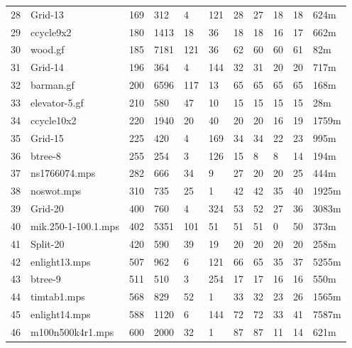 \documentclass{article}
\begin{document}
\begin{longtable}{|l |l |l |l |l |l |l |l |l |l |l |}
28&Grid-13&169&312&4&121&28&27&18&18&624m\\
29&ccycle9x2&180&1413&18&36&18&18&16&17&662m\\
30&wood.gf&185&7181&121&36&62&60&60&61&82m\\
31&Grid-14&196&364&4&144&32&31&20&20&717m\\
32&barman.gf&200&6596&117&13&65&65&65&65&168m\\
33&elevator-5.gf&210&580&47&10&15&15&15&15&28m\\
34&ccycle10x2&220&1940&20&40&20&20&16&19&1759m\\
35&Grid-15&225&420&4&169&34&34&22&23&995m\\
36&btree-8&255&254&3&126&15&8&8&14&194m\\
37&ns1766074.mps&282&666&34&9&27&20&20&25&444m\\
38&noswot.mps&310&735&25&1&42&42&35&40&1925m\\
39&Grid-20&400&760&4&324&53&52&27&36&3083m\\
40&mik.250-1-100.1.mps&402&5351&101&51&51&51&0&50&373m\\
41&Split-20&420&590&39&19&20&20&20&20&258m\\
42&enlight13.mps&507&962&6&121&66&65&35&37&5255m\\
43&btree-9&511&510&3&254&17&17&16&16&550m\\
44&timtab1.mps&568&829&52&1&33&32&23&26&1565m\\
45&enlight14.mps&588&1120&6&144&72&72&33&41&7587m\\
46&m100n500k4r1.mps&600&2000&32&1&87&87&11&14&621m\\
\hline
\end{longtable}
\end{document}
